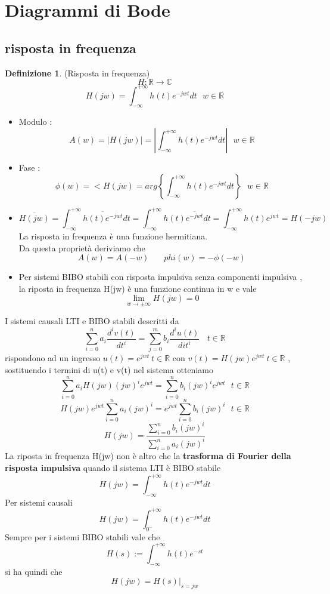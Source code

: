 \documentclass{article}
\theoremstyle{definition}
\newtheorem*{definizione}{Definizione}
\newcommand{\R}{\mathbb{R}}
\newcommand{\intinf}{\int_{-\infty}^{+\infty}}
\newcommand{\sistema}{\sum_{i=0}^{n}a_i \frac{d^i v(t)}{dt^i}=\sum_{j=0}^{m}b_i \frac{d^i u(t)}{dit^i}}
\begin{document}
\newpage
\section{Diagrammi di Bode}
\subsection{risposta in frequenza} 
\begin{definizione}(Risposta in frequenza)
	$$H: \R \to \mathbb{C}$$
	$$H(jw)=\intinf h(t)e^{-jwt}dt \ \ \  w \in \R $$
\end{definizione}
\begin{itemize}
\item Modulo : $$A(w)=|H(jw)|=\left|\intinf h(t)e^{-jwt}dt\right|\ \ \  w \in \R $$
\item Fase : $$\phi(w)=<H(jw)=arg\left\{\intinf h(t)e^{-jwt}dt\right\}\ \ \  w \in \R $$
\item $$\overline{H(jw)}=\intinf \overline{h(t)e^{-jwt}}dt = \intinf h(t)\overline{e^{-jwt}}dt = \intinf h(t)e^{jwt}=H(-jw) \ \ $$ La risposta in frequenza è una funzione hermitiana.\\Da questa proprietà deriviamo che 
$$A(w)=A(-w) \ \ \ \ \ \ \ \ phi(w)=-\phi(-w)$$
\item Per sistemi BIBO stabili con risposta impulsiva senza componenti impulsiva , la riposta in frequenza H(jw) è una funzione continua in w e vale 
$$\lim_{w \rightarrow \pm \infty }H(jw)=0$$
\end{itemize}
I sistemi causali LTI e BIBO stabili descritti da 
$$\sistema \ \ \ \ t \in \R$$ rispondono ad un ingresso $u(t)=e^{jwt} \  t \in \R$ con $v(t)=H(jw)e^{jwt} \ t \in \R$ , sostituendo i termini di u(t) e v(t) nel sistema otteniamo 
$$\sum_{i=0}^{n}a_iH(jw)(jw)^ie^{jwt}=\sum_{i=0}^{n}b_i(jw)^ie^{jwt}\ \ \ t \in \R$$
$$H(jw)e^{jwt}\sum_{i=0}^{n}a_i(jw)^i=e^{jwt}\sum_{i=0}^{n}b_i(jw)^i\ \ \ t \in \R$$ 
$$H(jw)=\frac{\sum_{i=0}^{n}b_i(jw)^i}{\sum_{i=0}^{n}a_i(jw)^i}$$
La riposta in frequenza H(jw) non è altro che la \textbf{trasforma di Fourier della risposta impulsiva} quando il sistema LTI è BIBO stabile
$$H(jw)=\intinf h(t)e^{-jwt}dt$$
Per sistemi causali 
$$H(jw)=\int_{0^-}^{+\infty} h(t)e^{-jwt}dt$$
Sempre per i sistemi BIBO stabili vale che 
$$H(s):=\intinf h(t)e^{-st}$$ si ha quindi che $$H(jw)=H(s)\big|_{s=jw}$$
\end{document}
